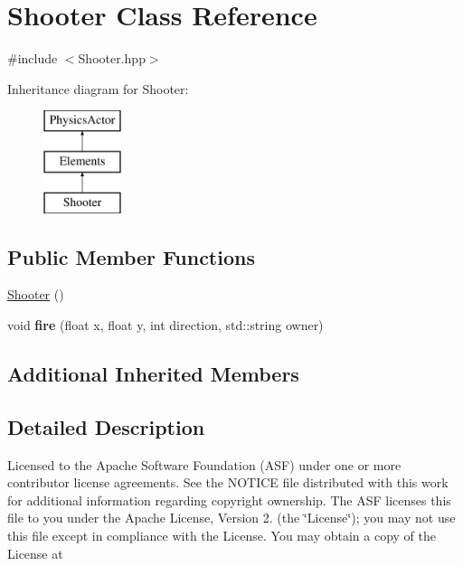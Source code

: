 \hypertarget{class_shooter}{\section{Shooter Class Reference}
\label{class_shooter}
}


{\ttfamily \#include $<$Shooter.\+hpp$>$}

Inheritance diagram for Shooter\+:\begin{figure}[H]
\begin{center}
\leavevmode
\includegraphics[height=3.000000cm]{class_shooter}
\end{center}
\end{figure}
\subsection*{Public Member Functions}
\begin{DoxyCompactItemize}
\item 
\hyperlink{class_shooter_acc429ebafcc36bb592c752097c22657f}{Shooter} ()
\item 
\hypertarget{class_shooter_adc34229494950169d09804f1d524ac7d}{void {\bfseries fire} (float x, float y, int direction, std\+::string owner)}\label{class_shooter_adc34229494950169d09804f1d524ac7d}

\end{DoxyCompactItemize}
\subsection*{Additional Inherited Members}


\subsection{Detailed Description}
Licensed to the Apache Software Foundation (A\+S\+F) under one or more contributor license agreements. See the N\+O\+T\+I\+C\+E file distributed with this work for additional information regarding copyright ownership. The A\+S\+F licenses this file to you under the Apache License, Version 2. (the \char`\"{}\+License\char`\"{}); you may not use this file except in compliance with the License. You may obtain a copy of the License at

